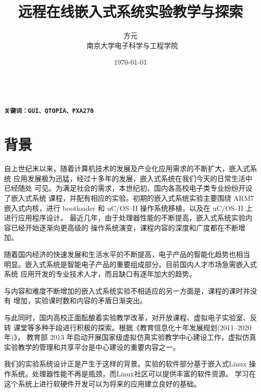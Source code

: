 \documentclass[nofonts]{ctexart}
\begin{document}
\sloppy

\title{
  远程在线嵌入式系统实验教学与探索
}
\author{方元\\ \ \small 南京大学电子科学与工程学院}
\date{\today}
\maketitle

\setlength{\parindent}{2em}

\begin{center} \begin{minipage}[t]{.8\textwidth}
\tt \baselineskip=4pt
\setlength\parindent{2em}\Large
{}\\
{\bf 关键词：GUI、QTOPIA、PXA270}
\end{minipage}
\end{center}

\section{背景}
    自上世纪末以来，随着计算机技术的发展及产业化应用需求的不断扩大，嵌入式系统
应用发展极为迅猛，经过十多年的发展，嵌入式系统在我们今天的日常生活中已经随处
可见。为满足社会的需求，本世纪初，国内各高校电子类专业纷纷开设了嵌入式系统
课程，并配有相应的实验。初期的嵌入式系统实验主要围绕 ARM7 嵌入式内核，进行
bootloader 和 uC/OS--II 操作系统移植，以及在 uC/OS--II 上进行应用程序设计。
最近几年，由于处理器性能的不断提高，嵌入式系统实验内容已经开始逐渐向更高级的
操作系统演变，课程内容的深度和广度都在不断增加。

    随着国内经济的快速发展和生活水平的不断提高，电子产品的智能化趋势也相当
明显。嵌入式系统是智能电子产品的重要组成部分。目前国内人才市场急需嵌入式系统
应用开发的专业技术人才，而且缺口有逐年加大的趋势。

    与内容和难度不断增加的嵌入式系统实验不相适应的另一方面是，课程的课时并没有
增加，实验课时数和内容的矛盾日渐突出。

    与此同时，国内高校正面酝酿着实验教学改革，对开放课程、虚拟电子实验室、反转
课堂等多种手段进行积极的探索。根据《教育信息化十年发展规划(2011--2020年)》，
教育部 2013 年启动开展国家级虚拟仿真实验教学中心建设工作，虚拟仿真
实验教学的管理和共享平台是中心建设的重要内容之一。

    我们的实验系统设计正是产生于这样的背景。实验的软件部分基于嵌入式Linux
操作系统。处理器性能不再是瓶颈，而Linux社区可以提供丰富的软件资源。
学习在这个系统上进行软硬件开发可以为将来的应用建立良好的基础。
\end{document}
